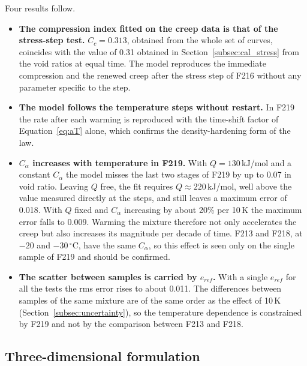 Four results follow.
\begin{itemize}
    \item \textbf{The compression index fitted on the creep data is that of the stress-step test.} $C_c = 0.313$, obtained from the whole set of curves, coincides with the value of 0.31 obtained in Section~\ref{subsec:cal_stress} from the void ratios at equal time. The model reproduces the immediate compression and the renewed creep after the stress step of F216 without any parameter specific to the step.
    \item \textbf{The model follows the temperature steps without restart.} In F219 the rate after each warming is reproduced with the time-shift factor of Equation~\eqref{eq:aT} alone, which confirms the density-hardening form of the law.
    \item \textbf{$C_\alpha$ increases with temperature in F219.} With $Q = 130$\,kJ/mol and a constant $C_\alpha$ the model misses the last two stages of F219 by up to 0.07 in void ratio. Leaving $Q$ free, the fit requires $Q\approx220$\,kJ/mol, well above the value measured directly at the steps, and still leaves a maximum error of 0.018. With $Q$ fixed and $C_\alpha$ increasing by about 20\% per 10\,K the maximum error falls to 0.009. Warming the mixture therefore not only accelerates the creep but also increases its magnitude per decade of time. F213 and F218, at $-20$ and $-30\,^\circ$C, have the same $C_\alpha$, so this effect is seen only on the single sample of F219 and should be confirmed.
    \item \textbf{The scatter between samples is carried by $e_{ref}$.} With a single $e_{ref}$ for all the tests the rms error rises to about 0.011. The differences between samples of the same mixture are of the same order as the effect of 10\,K (Section~\ref{subsec:uncertainty}), so the temperature dependence is constrained by F219 and not by the comparison between F213 and F218.
\end{itemize}

\subsection{Three-dimensional formulation}
\label{subsec:evp3d}

